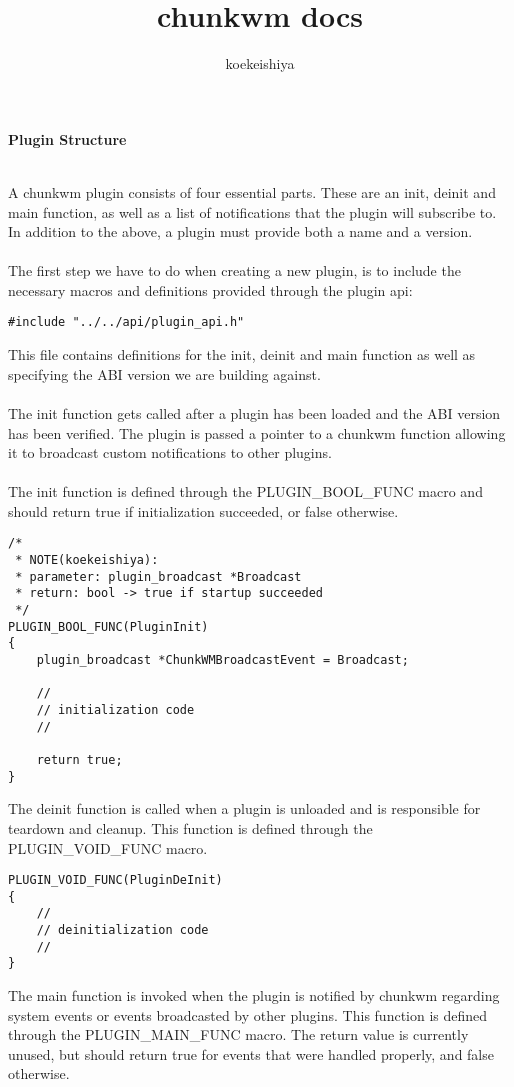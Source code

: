 \documentclass[14pt,a4paper]{article}
\author{koekeishiya}
\title{chunkwm docs}
\begin{document}
\RaggedRight

\begin{large}
\textbf{Plugin Structure}
\end{large}
\medskip
\\A chunkwm plugin consists of four essential parts. These are an init, deinit and main function, as well as a list of notifications that the plugin will subscribe to. In addition to the above, a plugin must provide both a name and a version.
\\\
\\The first step we have to do when creating a new plugin, is to include the necessary macros and definitions provided
through the plugin api:
\begin{lstlisting}[basicstyle=\tiny]
#include "../../api/plugin_api.h"
\end{lstlisting}
This file contains definitions for the init, deinit and main function as well as specifying the ABI version we are building against.
\\\
\\The init function gets called after a plugin has been loaded and the ABI version has been verified. The plugin is passed a pointer to a chunkwm function allowing it to broadcast custom notifications to other plugins.
\\\
\\The init function is defined through the PLUGIN\_BOOL\_FUNC macro and should return true if initialization succeeded, or false otherwise.
\begin{lstlisting}[basicstyle=\tiny]
/*
 * NOTE(koekeishiya):
 * parameter: plugin_broadcast *Broadcast
 * return: bool -> true if startup succeeded
 */
PLUGIN_BOOL_FUNC(PluginInit)
{
    plugin_broadcast *ChunkWMBroadcastEvent = Broadcast;
    
    //
    // initialization code
    //
    
    return true;
}
\end{lstlisting}
The deinit function is called when a plugin is unloaded and is responsible for teardown and cleanup. This function is defined through the PLUGIN\_VOID\_FUNC macro.
\begin{lstlisting}[basicstyle=\tiny]
PLUGIN_VOID_FUNC(PluginDeInit)
{
    //
    // deinitialization code
    //
}
\end{lstlisting}
The main function is invoked when the plugin is notified by chunkwm regarding system events or events broadcasted by other plugins.
This function is defined through the PLUGIN\_MAIN\_FUNC macro. The return value is currently unused, but should return true for events that were handled properly, and false otherwise.
\end{document}
